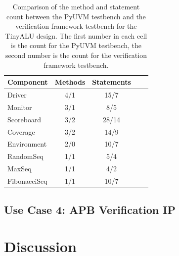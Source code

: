 \begin{table}
  \centering
  \begin{tabular}{|l|c|c|c|c|}
    \hline
    \textbf{Component}       & \textbf{Methods} & \textbf{Statements} \\ \hline
    Driver          & 4/1             & 15/7 \\ \hline
    Monitor         & 3/1             & 8/5    \\ \hline
    Scoreboard       & 3/2            & 28/14    \\ \hline
    Coverage      & 3/2             & 14/9      \\ \hline
    Environment        & 2/0             & 10/7    \\ \hline
    RandomSeq   & 1/1 & 5/4 \\ \hline
    MaxSeq   & 1/1 & 4/2 \\ \hline
    FibonacciSeq   & 1/1 & 10/7 \\ \hline
  \end{tabular}
  \caption{Comparison of the method and statement count between the PyUVM testbench and the verification framework
    testbench for the TinyALU design. The first number in each cell is the count for the PyUVM testbench, the second
  number is the count for the verification framework testbench.}
  \label{tab:comparison}
\end{table}




\section{Use Case 4: APB Verification IP} %


\cite{didactic}

\chapter{Discussion} %

